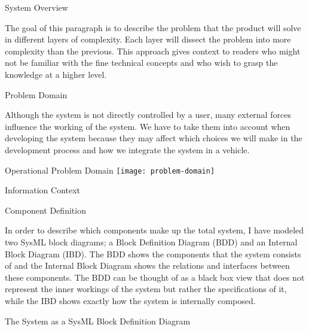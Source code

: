 \documentclass{matthijs}
\begin{document}
	\begin{hoofdstuk}{System Overview}

		The goal of this paragraph is to describe the problem that the product will solve in different layers of complexity.
		Each layer will dissect the problem into more complexity than the previous.
		This approach gives context to readers who might not be familiar with the fine technical concepts and who wish to grasp the knowledge at a higher level.

		\begin{paragraaf}{Problem Domain}

			Although the system is not directly controlled by a user, many external forces influence the working of the system.
			We have to take them into account when developing the system because they may affect which choices we will make in the development process and how we integrate the system in a vehicle.

			\begin{figuur}{Operational Problem Domain}
				\singlespacing
				\texttt{[image: problem-domain]}
				\onehalfspacing
			\end{figuur}

		\end{paragraaf}

		\begin{paragraaf}{Information Context}

		\end{paragraaf}

		\begin{paragraaf}{Component Definition}

			In order to describe which components make up the total system, I have modeled two SysML block diagrams; a Block Definition Diagram (BDD) and an Internal Block Diagram (IBD).
			The BDD shows the components that the system consists of and the Internal Block Diagram shows the relations and interfaces between these components.
			The BDD can be thought of as a black box view that does not represent the inner workings of the system but rather the specifications of it, while the IBD shows exactly how the system is internally composed.

			\begin{figuur}{The System as a SysML Block Definition Diagram}
				\singlespacing
				\onehalfspacing
			\end{figuur}

		\end{paragraaf}


\end{hoofdstuk}
\end{document}
